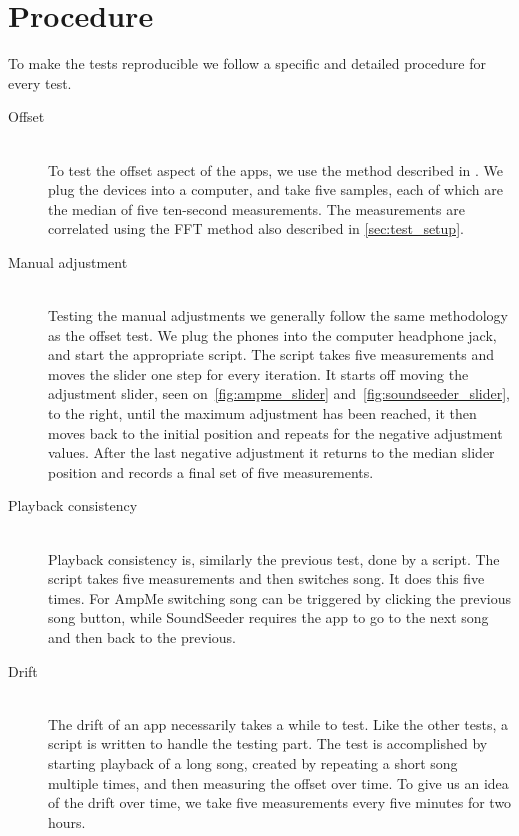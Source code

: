 \section{Procedure}\label{sec:test_procedure}
To make the tests reproducible we follow a specific and detailed
procedure for every test.

\begin{description}
\item[Offset] \hfill\\
To test the offset aspect of the apps, we use the method described in
. We plug the devices into a computer, and take
five samples, each of which are the median of five ten-second measurements. The
measurements are correlated using the \ac{FFT} method also described in
\cref{sec:test_setup}.

\item[Manual adjustment] \hfill\\
Testing the manual adjustments we generally follow the same methodology as
the offset test. We plug the phones into the computer headphone jack,
and start the appropriate script. The script takes five measurements and moves the
slider one step for every iteration. It starts off moving the adjustment
slider, seen on~\vref{fig:ampme_slider} and~\vref{fig:soundseeder_slider}, to the right, until the maximum adjustment has
been reached, it then moves back to the initial position and repeats for
the negative adjustment values. After the last negative adjustment it
returns to the median slider position and records a final set of
five measurements.

\item[Playback consistency] \hfill\\
Playback consistency is, similarly the previous test, done by a script. The
script takes five measurements and then switches song. It does this
five times. For AmpMe switching song can be triggered by clicking the
previous song button, while SoundSeeder requires the app to go to the
next song and then back to the previous.

\item[Drift] \hfill\\
The drift of an app necessarily takes a while to test. Like the other
tests, a script is written to handle the testing part. The test is
accomplished by starting playback of a long song, created by repeating
a short song multiple times, and then measuring the offset over time. To
give us an idea of the drift over time, we take five measurements every five minutes
for two hours.
\end{description}
